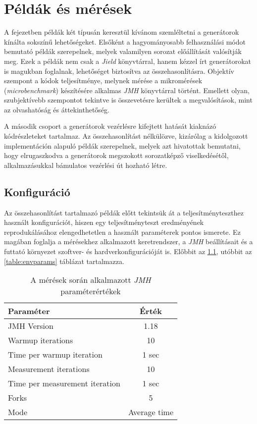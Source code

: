 \chapter{Példák és mérések}\label{ch:peldakEsMeresek}

A fejezetben példák két típusán keresztül kívánom szemléltetni a generátorok kínálta sokszínű lehetőségeket. Elsőként a hagyományosabb felhasználási módot bemutató példák szerepelnek, melyek valamilyen sorozat előállítását valósítják meg. Ezek a példák nem csak a \textit{Jield} könyvtárral, hanem kézzel írt generátorokat is magukban foglalnak, lehetőséget biztosítva az összehasonlításra. Objektív szempont a kódok teljesítménye, melynek mérése a mikromérések (\textit{microbenchmark}) készítésére alkalmas \textit{JMH} könyvtárral történt. Emellett olyan, szubjektívebb szempontot tekintve is összevetésre kerültek a megvalósítások, mint az olvashatóság és áttekinthetőség.

A második csoport a generátorok vezérlésre kifejtett hatását kiaknázó kódrészleteket tartalmaz. Az összehasonlítást nélkülözve, kizárólag a kidolgozott implementáción alapuló példák szerepelnek, melyek azt hivatottak bemutatni, hogy elrugaszkodva a generátorok megszokott sorozatképző viselkedésétől, alkalmazásukkal bámulatos vezérlési út hozható létre.

\section{Konfiguráció}

Az összehasonlítást tartalmazó példák előtt tekintsük át a teljesítményteszthez használt konfigurációt, hiszen egy teljesítményteszt eredményének reprodukálásához elengedhetetlen a használt paraméterek pontos ismerete. Ez magában foglalja a mérésekhez alkalmazott keretrendszer, a \textit{JMH} beállításait és a futtató környezet szoftver- és hardverkonfigurációját is. Előbbit az \ref{table:jmhparams}, utóbbit az \ref{table:envparams} táblázat tartalmazza.

\begin{table}[h]
\captionsetup{justification=centering}
\centering
  \begin{tabular}{|| l | c ||}
  \hline
  Paraméter & Érték \\
  \hline \hline
  JMH Version                        & 1.18 \\
  \hline
  Warmup iterations                  & 10 \\
  Time per warmup iteration          & 1 sec \\
  \hline
  Measurement iterations             & 10 \\
  Time per measurement iteration     & 1 sec \\
  \hline
  Forks                              & 5 \\
  \hline                               
  Mode                               & Average time \\
  \hline
  \end{tabular}
\caption{A mérések során alkalmazott \textit{JMH} paraméterértékek}  
\label{table:jmhparams}
\end{table}

